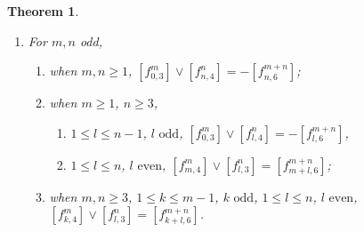 \documentclass[10pt, reqno]{amsart}
\newtheorem{theorem}{Theorem}[section]
\theoremstyle{definition}
\theoremstyle{remark}
\numberwithin{equation}{section}
\begin{document}
\begin{theorem}
\begin{enumerate}
\begin{enumerate}
    \item when \(m\ge1\), \(n\ge 4\),
    \begin{enumerate}
        \item  \(1\le l\le n-1\), \(l\text{ even}\), $[f_{0,3}^m]\lor[f_{l,1}^n]=[f_{l,3}^{m+n}]$,
        $[f_{0,6}^m]\lor[f_{l,1}^n]= 0$,
        \item  \(1\le l\le n-1\), \(l\text{ even}\), $[f_{m,4}^m]\lor[f_{l,1}^n]=[f_{m+l,4}^{m+n}]$,
        $[f_{m,6}^m]\lor[f_{l,1}^n]= 0$;
    \end{enumerate}
    
    \item when \(m\ge3\), \(n\ge 2\),
    \begin{enumerate}
        \item \(1\le k\le m\), \(k\text{ even}\),
        $[f_{k,3}^m]\lor[f_{n,1}^n]= [f_{n+k,3}^{m+n}]$,
        \item \(1\le k\le m-1\), \(k\text{ odd}\), $[f_{k,4}^m]\lor[f_{n,1}^n]=[f_{n+k,4}^{m+n}]$,
        $[f_{k,4}^m]\lor[f_{n,3}^n]=0$;
    \end{enumerate}
    
    \item when \(m\ge3\), \(n\ge 4\),
    \begin{enumerate}
        \item \(1\le k\le m\), \(1\le l\le n-1\), \(k,l\text{ even}\),
        \([f_{k,3}^m]\lor[f_{l,1}^n]=[f_{k+l,3}^{m+n}]\),

        \item \(1\le k\le m-1\), \(k\text{ odd}\), \(1\le l\le n-1\), \(l\text{ even}\),
        \([f_{k,4}^m]\lor[f_{l,1}^n]=[f_{k+l,4}^{m+n}]\).
    \end{enumerate}
\end{enumerate}
              
        \item For \(m, n\) odd, 
            \begin{enumerate}
                \item when \(m,n\ge1\),
  $[f_{0,3}^m]\lor[f_{n,4}^n]= -[f_{n,6}^{m+n}]$;
                \item  when \(m\ge1\), \(n\ge3\),
    \begin{enumerate}
        \item \(1\le l\le n-1\), \(l\text{ odd}\),
        $[f_{0,3}^m]\lor[f_{l,4}^n]= -[f_{l,6}^{m+n}]$,
        \item \(1\le l\le n\), \(l\text{ even}\),
        $[f_{m,4}^m]\lor[f_{l,3}^n]= [f_{m+l,6}^{m+n}]$;
    \end{enumerate}
               \item when \(m,n\ge3\), \(1\le k\le m-1\), \(k\text{ odd}\), \(1\le l\le n\), \(l\text{ even}\),
        \([f_{k,4}^m]\lor[f_{l,3}^n]=[f_{k+l,6}^{m+n}]\).
            \end{enumerate}   
    \end{enumerate}
\end{theorem}
\end{document}
